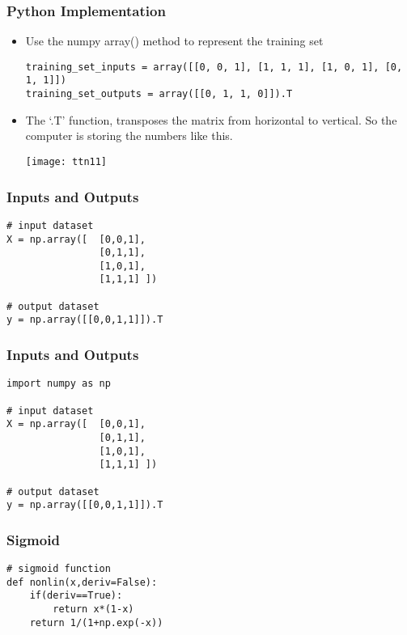\begin{frame}[fragile] \frametitle{Python Implementation}
\begin{itemize}
\item Use the numpy array() method to represent the training set 
\begin{lstlisting}
training_set_inputs = array([[0, 0, 1], [1, 1, 1], [1, 0, 1], [0, 1, 1]])
training_set_outputs = array([[0, 1, 1, 0]]).T
\end{lstlisting}
\item The ‘.T’ function, transposes the matrix from horizontal to vertical. So the computer is storing the numbers like this.
\begin{center}
\texttt{[image: ttn11]}
\end{center}
\end{itemize}
\end{frame}

\begin{frame}[fragile] \frametitle{Inputs and Outputs}

\begin{lstlisting}
# input dataset
X = np.array([  [0,0,1],
                [0,1,1],
                [1,0,1],
                [1,1,1] ])
    
# output dataset            
y = np.array([[0,0,1,1]]).T
\end{lstlisting}
\end{frame}


\begin{frame}[fragile] \frametitle{Inputs and Outputs}

\begin{lstlisting}
import numpy as np

# input dataset
X = np.array([  [0,0,1],
                [0,1,1],
                [1,0,1],
                [1,1,1] ])
    
# output dataset            
y = np.array([[0,0,1,1]]).T
\end{lstlisting}
\end{frame}


\begin{frame}[fragile] \frametitle{Sigmoid}

\begin{lstlisting}
# sigmoid function
def nonlin(x,deriv=False):
    if(deriv==True):
        return x*(1-x)
    return 1/(1+np.exp(-x))
\end{lstlisting}
\end{frame}

